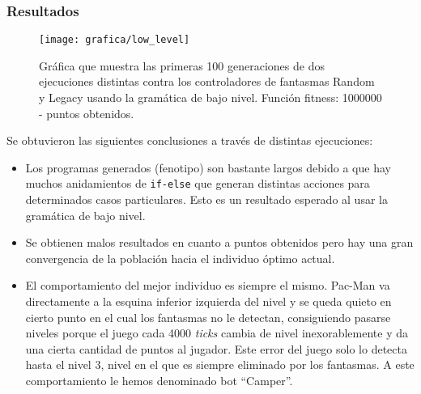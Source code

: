 \subsubsection{Resultados}
\begin{figure}[H]
\centering
\texttt{[image: grafica/low\_level]}
\caption{Gráfica que muestra las primeras 100 generaciones de dos ejecuciones distintas contra los controladores de fantasmas Random y Legacy usando la gramática de bajo nivel. Función fitness: 1000000 - puntos obtenidos.}
\end{figure}

Se obtuvieron las siguientes conclusiones a través de distintas ejecuciones:
\begin{itemize}
\item Los programas generados (fenotipo) son bastante largos debido a que hay muchos anidamientos de \texttt{if-else} que generan distintas acciones para determinados casos particulares. Esto es un resultado esperado al usar la gramática de bajo nivel.

\item Se obtienen malos resultados en cuanto a puntos obtenidos pero hay una gran convergencia de la población hacia el individuo óptimo actual.

\item El comportamiento del mejor individuo es siempre el mismo. Pac-Man va directamente a la esquina inferior izquierda del nivel y se queda quieto en cierto punto en el cual los fantasmas no le detectan, consiguiendo pasarse niveles porque el juego cada 4000 \textit{ticks} cambia de nivel inexorablemente y da una cierta cantidad de puntos al jugador. Este error del juego solo lo detecta hasta el nivel 3, nivel en el que es siempre eliminado por los fantasmas. A este comportamiento le hemos denominado bot ``Camper''.
\end{itemize}

